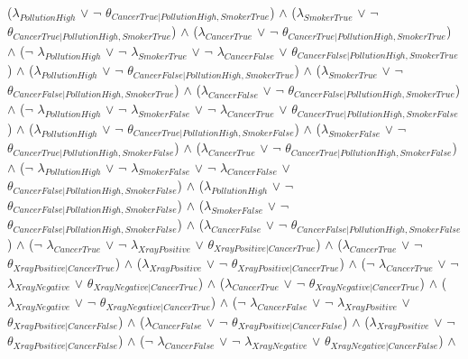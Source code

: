 \begin{center}
 ($\lambda_{PollutionHigh}$ $\lor$ $\neg$ $\theta_{CancerTrue|PollutionHigh,SmokerTrue}$) $\land$ 
 ($\lambda_{SmokerTrue}$ $\lor$ $\neg$ $\theta_{CancerTrue|PollutionHigh,SmokerTrue}$) $\land$ 
 ($\lambda_{CancerTrue}$ $\lor$ $\neg$ $\theta_{CancerTrue|PollutionHigh,SmokerTrue}$) $\land$ 
 ($\neg$ $\lambda_{PollutionHigh}$ $\lor$ $\neg$ $\lambda_{SmokerTrue}$ $\lor$ $\neg$ $\lambda_{CancerFalse}$ $\lor$ $\theta_{CancerFalse|PollutionHigh,SmokerTrue}$) $\land$ 
 ($\lambda_{PollutionHigh}$ $\lor$ $\neg$ $\theta_{CancerFalse|PollutionHigh,SmokerTrue}$) $\land$ 
 ($\lambda_{SmokerTrue}$ $\lor$ $\neg$ $\theta_{CancerFalse|PollutionHigh,SmokerTrue}$) $\land$ 
 ($\lambda_{CancerFalse}$ $\lor$ $\neg$ $\theta_{CancerFalse|PollutionHigh,SmokerTrue}$) $\land$ 
 ($\neg$ $\lambda_{PollutionHigh}$ $\lor$ $\neg$ $\lambda_{SmokerFalse}$ $\lor$ $\neg$ $\lambda_{CancerTrue}$ $\lor$ $\theta_{CancerTrue|PollutionHigh,SmokerFalse}$) $\land$ 
 ($\lambda_{PollutionHigh}$ $\lor$ $\neg$ $\theta_{CancerTrue|PollutionHigh,SmokerFalse}$) $\land$ 
 ($\lambda_{SmokerFalse}$ $\lor$ $\neg$ $\theta_{CancerTrue|PollutionHigh,SmokerFalse}$) $\land$ 
 ($\lambda_{CancerTrue}$ $\lor$ $\neg$ $\theta_{CancerTrue|PollutionHigh,SmokerFalse}$) $\land$ 
 ($\neg$ $\lambda_{PollutionHigh}$ $\lor$ $\neg$ $\lambda_{SmokerFalse}$ $\lor$ $\neg$ $\lambda_{CancerFalse}$ $\lor$ $\theta_{CancerFalse|PollutionHigh,SmokerFalse}$) $\land$ 
 ($\lambda_{PollutionHigh}$ $\lor$ $\neg$ $\theta_{CancerFalse|PollutionHigh,SmokerFalse}$) $\land$ 
 ($\lambda_{SmokerFalse}$ $\lor$ $\neg$ $\theta_{CancerFalse|PollutionHigh,SmokerFalse}$) $\land$ 
 ($\lambda_{CancerFalse}$ $\lor$ $\neg$ $\theta_{CancerFalse|PollutionHigh,SmokerFalse}$) $\land$ 
 ($\neg$ $\lambda_{CancerTrue}$ $\lor$ $\neg$ $\lambda_{XrayPositive}$ $\lor$ $\theta_{XrayPositive|CancerTrue}$) $\land$ 
 ($\lambda_{CancerTrue}$ $\lor$ $\neg$ $\theta_{XrayPositive|CancerTrue}$) $\land$ 
 ($\lambda_{XrayPositive}$ $\lor$ $\neg$ $\theta_{XrayPositive|CancerTrue}$) $\land$ 
 ($\neg$ $\lambda_{CancerTrue}$ $\lor$ $\neg$ $\lambda_{XrayNegative}$ $\lor$ $\theta_{XrayNegative|CancerTrue}$) $\land$ 
 ($\lambda_{CancerTrue}$ $\lor$ $\neg$ $\theta_{XrayNegative|CancerTrue}$) $\land$ 
 ($\lambda_{XrayNegative}$ $\lor$ $\neg$ $\theta_{XrayNegative|CancerTrue}$) $\land$ 
 ($\neg$ $\lambda_{CancerFalse}$ $\lor$ $\neg$ $\lambda_{XrayPositive}$ $\lor$ $\theta_{XrayPositive|CancerFalse}$) $\land$ 
 ($\lambda_{CancerFalse}$ $\lor$ $\neg$ $\theta_{XrayPositive|CancerFalse}$) $\land$ 
 ($\lambda_{XrayPositive}$ $\lor$ $\neg$ $\theta_{XrayPositive|CancerFalse}$) $\land$ 
 ($\neg$ $\lambda_{CancerFalse}$ $\lor$ $\neg$ $\lambda_{XrayNegative}$ $\lor$ $\theta_{XrayNegative|CancerFalse}$) $\land$ 

\end{center}
